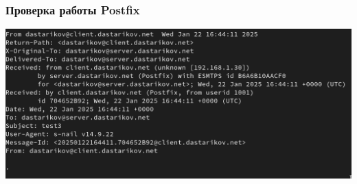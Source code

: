 \begin{frame}
\frametitle{Проверка работы Postfix}
    \centering
    \includegraphics[width=\textwidth]{../images/image20.png}
\end{frame}

